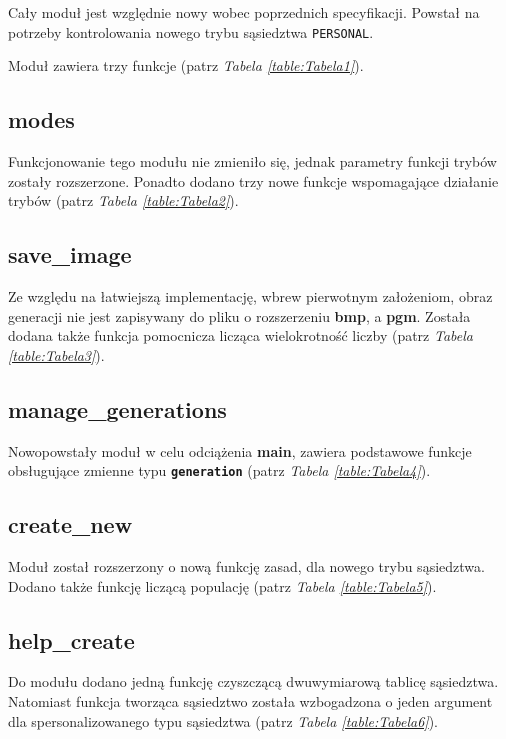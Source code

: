 \documentclass[a4paper]{article}
\begin{document}
\quad Ca\l{}y modu\l{} jest wzgl\k{e}dnie nowy wobec poprzednich specyfikacji.
Powsta\l{} na potrzeby kontrolowania nowego trybu s\k{a}siedztwa \texttt{PERSONAL}.


Modu\l{} zawiera trzy funkcje (patrz \textit{Tabela \ref{table:Tabela1}}).

\subsection{modes}

\quad Funkcjonowanie tego modu\l{}u nie zmieni\l{}o si\k{e}, jednak parametry funkcji tryb\'ow zosta\l{}y rozszerzone.
Ponadto dodano trzy nowe funkcje wspomagaj\k{a}ce dzia\l{}anie tryb\'ow (patrz \textit{Tabela \ref{table:Tabela2}}).


\subsection{save\_image}

\quad Ze wzgl\k{e}du na \l{}atwiejsz\k{a} implementacj\k{e}, wbrew pierwotnym za\l{}o\.zeniom, 
obraz generacji nie jest zapisywany do pliku o rozszerzeniu \textbf{bmp}, a \textbf{pgm}.
Zosta\l{}a dodana tak\.ze funkcja pomocnicza licz\k{a}ca wielokrotno\'s\'c liczby (patrz \textit{Tabela \ref{table:Tabela3}}).


\subsection{manage\_generations}

\quad Nowopowsta\l{}y modu\l{} w celu odci\k{a}\.zenia \textbf{main}, zawiera podstawowe funkcje obs\l{}uguj\k{a}ce zmienne typu \textbf{\texttt{generation}} (patrz \textit{Tabela \ref{table:Tabela4}}).

\subsection{create\_new}

\quad Modu\l{} zosta\l{} rozszerzony o now\k{a} funkcj\k{e} zasad, dla nowego trybu s\k{a}siedztwa.
Dodano tak\.ze funkcj\k{e} licz\k{a}c\k{a} populacj\k{e} (patrz \textit{Tabela \ref{table:Tabela5}}).


\subsection{help\_create}

\quad Do modu\l{}u dodano jedn\k{a} funkcj\k{e} czyszcz\k{a}c\k{a} dwuwymiarow\k{a} tablic\k{e} s\k{a}siedztwa.
Natomiast funkcja tworz\k{a}ca s\k{a}siedztwo zosta\l{}a wzbogadzona o jeden argument dla spersonalizowanego typu s\k{a}siedztwa (patrz \textit{Tabela \ref{table:Tabela6}}).
\end{document}
